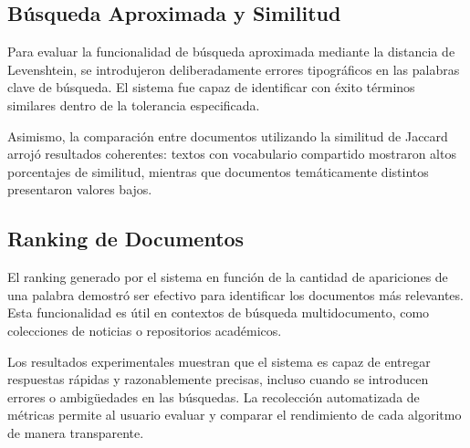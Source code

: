 \documentclass[9pt,letterpaper,onecolumn]{rho-class/rho}
\begin{document}
\subsection{Búsqueda Aproximada y Similitud}

Para evaluar la funcionalidad de búsqueda aproximada mediante la distancia de Levenshtein, se introdujeron deliberadamente errores tipográficos en las palabras clave de búsqueda. El sistema fue capaz de identificar con éxito términos similares dentro de la tolerancia especificada.

Asimismo, la comparación entre documentos utilizando la similitud de Jaccard arrojó resultados coherentes: textos con vocabulario compartido mostraron altos porcentajes de similitud, mientras que documentos temáticamente distintos presentaron valores bajos.


\subsection{Ranking de Documentos}

El ranking generado por el sistema en función de la cantidad de apariciones de una palabra demostró ser efectivo para identificar los documentos más relevantes. Esta funcionalidad es útil en contextos de búsqueda multidocumento, como colecciones de noticias o repositorios académicos.


Los resultados experimentales muestran que el sistema es capaz de entregar respuestas rápidas y razonablemente precisas, incluso cuando se introducen errores o ambigüedades en las búsquedas. La recolección automatizada de métricas permite al usuario evaluar y comparar el rendimiento de cada algoritmo de manera transparente.
\end{document}
